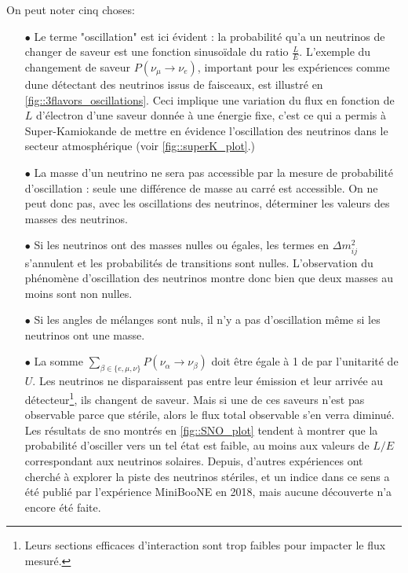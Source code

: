         On peut noter cinq choses:
        \begin{itemize}
          \item[$\bullet$] Le terme "oscillation" est ici évident : la probabilité qu'a un neutrinos de changer de saveur est une fonction sinusoïdale du ratio $\frac{L}{E}$. L'exemple du changement de saveur $P(\nu_{\mu}\to\nu_e)$, important pour les expériences comme \gls{dune} détectant des neutrinos issus de faisceaux, est illustré en \autoref{fig::3flavors_oscillations}. Ceci implique une variation du flux en fonction de $L$ d'électron d'une saveur donnée à une énergie fixe, c'est ce qui a permis à Super-Kamiokande de mettre en évidence l'oscillation des neutrinos dans le secteur atmosphérique (voir \autoref{fig::superK_plot}.)
          \item[$\bullet$] La masse d'un neutrino ne sera pas accessible par la mesure de probabilité d'oscillation : seule une différence de masse au carré est accessible. On ne peut donc pas, avec les oscillations des neutrinos, déterminer les valeurs des masses des neutrinos.
          \item[$\bullet$] Si les neutrinos ont des masses nulles ou égales, les termes en $\Delta m_{ij}^2$ s'annulent et les probabilités de transitions sont nulles. L'observation du phénomène d'oscillation des neutrinos montre donc bien que deux masses au moins sont non nulles.
          \item[$\bullet$] Si les angles de mélanges sont nuls, il n'y a pas d'oscillation même si les neutrinos ont une masse.
          \item[$\bullet$] La somme $\sum_{\beta\in\{e,\mu,\nu\}}P(\nu_{\alpha}\to\nu_{\beta})$ doit être égale à 1 de par l'unitarité de $U$. Les neutrinos ne disparaissent pas entre leur émission et leur arrivée au détecteur\footnote{Leurs sections efficaces d'interaction sont trop faibles pour impacter le flux mesuré.}, ils changent de saveur. Mais si une de ces saveurs n'est pas observable parce que stérile, alors le flux total observable s'en verra diminué. Les résultats de \gls{sno} montrés en \autoref{fig::SNO_plot} tendent à montrer que la probabilité d'osciller vers un tel état est faible, au moins aux valeurs de $L/E$ correspondant aux neutrinos solaires. Depuis, d'autres expériences ont cherché à explorer la piste des neutrinos stériles, et un indice dans ce sens a été publié par l'expérience MiniBooNE\cite{Arevalo2018} en 2018, mais aucune découverte n'a encore été faite.
        \end{itemize}



